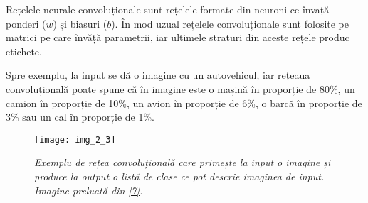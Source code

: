 Rețelele neurale convoluționale sunt rețelele formate din neuroni ce învață ponderi ($w$) și biasuri ($b$). În mod uzual rețelele convoluționale sunt folosite pe matrici pe care învăță parametrii, iar ultimele straturi din aceste rețele produc etichete. 

Spre exemplu, la input se dă o imagine cu un autovehicul, iar rețeaua convoluțională poate spune că în imagine este o mașină în proporție de 80\%, un camion în proporție de 10\%, un avion în proporție de 6\%, o barcă în proporție de 3\% sau un cal în proporție de 1\%.
\begin{figure}[!h]
	\centering
	\texttt{[image: img\_2\_3]}
	\caption[Exemplu rețea convoluțională]{\textit{Exemplu de rețea convoluțională care primește la input o imagine și produce la output o listă de clase ce pot descrie imaginea de input. Imagine preluată din \hyperlink{datameetsmedia}{[7]}.}}
\end{figure} 

